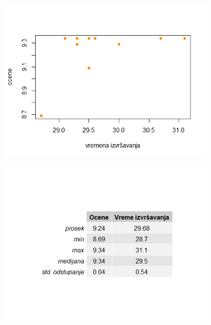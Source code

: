 \documentclass[a4paper]{article}
\begin{document}
\begin{figure}[H]
    \centering
    \begin{subfigure}{0.49\textwidth}
    \includegraphics[width = \textwidth]{img/genetski_plot.png}
    \end{subfigure}
    \hfill
    \begin{subfigure}{0.49\textwidth}
    \includegraphics[width = \textwidth]{img/genetski_tabela.png}
    \end{subfigure}
    \caption{Ponašanje genetskog algoritma}
    \label{fig:my_label}
    \centering
    \begin{subfigure}{0.49\textwidth}

\end{subfigure}
\end{figure}
\end{document}
